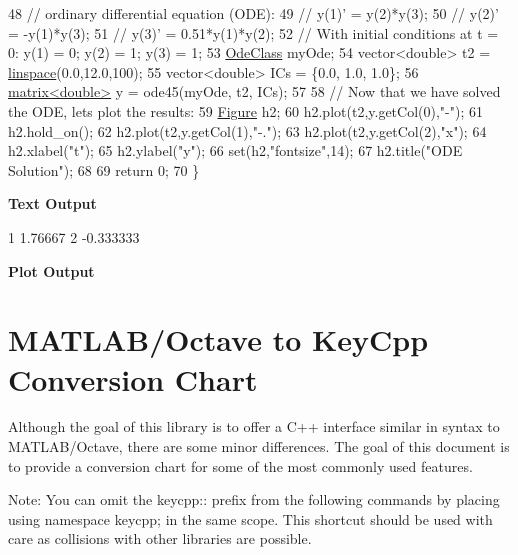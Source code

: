\begin{DoxyCodeInclude}
48     \textcolor{comment}{// ordinary differential equation (ODE):}
49     \textcolor{comment}{// y(1)' = y(2)*y(3);}
50     \textcolor{comment}{// y(2)' = -y(1)*y(3);}
51     \textcolor{comment}{// y(3)' = 0.51*y(1)*y(2);}
52     \textcolor{comment}{// With initial conditions at t = 0: y(1) = 0; y(2) = 1; y(3) = 1;}
53     \hyperlink{class_ode_class}{OdeClass} myOde;
54     vector<double> t2 = \hyperlink{namespacekeycpp_a4e8769de1f22713d3564350d53125b26}{linspace}(0.0,12.0,100);
55     vector<double> ICs = \{0.0, 1.0, 1.0\};
56     \hyperlink{classkeycpp_1_1matrix}{matrix<double>} y = ode45(myOde, t2, ICs);
57     
58     \textcolor{comment}{// Now that we have solved the ODE, lets plot the results:}
59     \hyperlink{classkeycpp_1_1_figure}{Figure} h2;
60     h2.plot(t2,y.getCol(0),\textcolor{stringliteral}{"-"});
61     h2.hold\_on();
62     h2.plot(t2,y.getCol(1),\textcolor{stringliteral}{"-."});
63     h2.plot(t2,y.getCol(2),\textcolor{stringliteral}{"x"});
64     h2.xlabel(\textcolor{stringliteral}{"t"});
65     h2.ylabel(\textcolor{stringliteral}{"y"});
66     \textcolor{keyword}{set}(h2,\textcolor{stringliteral}{"fontsize"},14);
67     h2.title(\textcolor{stringliteral}{"ODE Solution"});
68     
69     \textcolor{keywordflow}{return} 0;
70 \}
\end{DoxyCodeInclude}
 \par
 {\bfseries {\ttfamily Text} Output} 
\begin{DoxyCodeInclude}
1 1.76667
2 -0.333333
\end{DoxyCodeInclude}
 \par
 {\bfseries {\ttfamily Plot} Output}  \par
  \par


\section*{M\-A\-T\-L\-A\-B/\-Octave to Key\-Cpp Conversion Chart}

Although the goal of this library is to offer a C++ interface similar in syntax to M\-A\-T\-L\-A\-B/\-Octave, there are some minor differences. The goal of this document is to provide a conversion chart for some of the most commonly used features.

Note\-: You can omit the {\ttfamily keycpp\-:\-:} prefix from the following commands by placing {\ttfamily using namespace keycpp;} in the same scope. This shortcut should be used with care as collisions with other libraries are possible.

